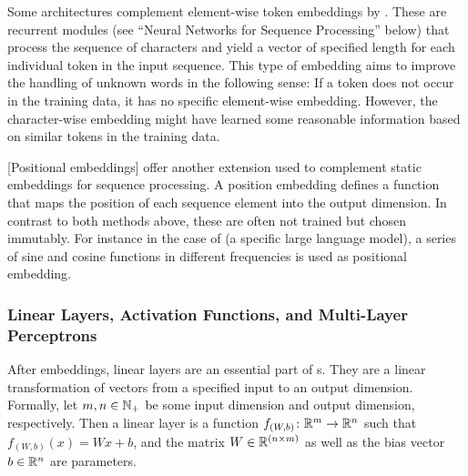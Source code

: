 \documentclass[../document.tex]{subfiles}
\begin{document}
    Some architectures complement element-wise token embeddings by  \citep[e.g.\@][]{kiperwasser2016simple,Akb18}.
    These are recurrent modules (see ``Neural Networks for Sequence Processing'' below) that process the sequence of characters and yield a vector of specified length for each individual token in the input sequence.
    This type of embedding aims to improve the handling of unknown words in the following sense:
        If a token does not occur in the training data, it has no specific element-wise embedding.
        However, the character-wise embedding might have learned some reasonable information based on similar tokens in the training data.

    [Positional embeddings] offer another extension used to complement static embeddings for sequence processing.
    A position embedding defines a function that maps the position of each sequence element into the output dimension.
    In contrast to both methods above, these are often not trained but chosen immutably.
    For instance in the case of  (a specific large language model), a series of sine and cosine functions in different frequencies is used as positional embedding.

    \subsubsection{Linear Layers, Activation Functions, and Multi-Layer Perceptrons}
    After embeddings, linear layers are an essential part of s.
    They are a linear transformation of vectors from a specified input to an output dimension.
    Formally, let \(m, n \in \mathbb{N}_+\) be some input dimension and output dimension, respectively.
    Then a linear layer is a function \(f_{(W,b)}\colon \mathbb{R}^m \to \mathbb{R}^n\) such that \(f_{(W,b)}(x) = Wx+b\), and the matrix \(W \in \mathbb{R}^{(n\times m)}\) as well as the bias vector \(b\in \mathbb{R}^n\) are parameters.
\end{document}
